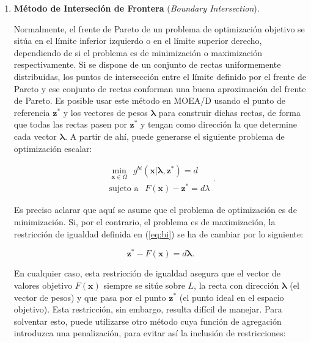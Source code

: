 \begin{enumerate}
	
	\item \textbf{Método de Interseción de Frontera} (\emph{Boundary Intersection}).
	
	
	Normalmente, el frente de Pareto de un problema de optimización objetivo se sitúa en el límite inferior izquierdo o en el límite superior derecho, dependiendo de si el problema es de minimización o maximización respectivamente. Si se dispone de un conjunto de rectas uniformemente distribuidas, los puntos de intersección entre el límite definido por el frente de Pareto y ese conjunto de rectas conforman una buena aproximación del frente de Pareto. Es posible usar este método en MOEA/D usando el punto de referencia $\textbf{z}^*$ y los vectores de pesos $\boldsymbol\lambda$ para construir dichas rectas, de forma que todas las rectas pasen por $\textbf{z}^*$ y tengan como dirección la que determine cada vector $\boldsymbol\lambda$. A partir de ahí, puede generarse el siguiente problema de optimización escalar:
	
	\begin{equation}
	\begin{array}{c}
		\min_{\textbf{x} \in \Omega}{~~g^{bi}(\textbf{x} | \boldsymbol\lambda, \textbf{z}^*) = d} \\
		\text{sujeto a  } ~~F(\textbf{x}) - \textbf{z}^* = d \lambda
		\end{array}.
		\label{eq:bi}
	\end{equation}

	Es preciso aclarar que aquí se asume que el problema de optimización es de minimización. Si, por el contrario, el problema es de maximización, la restricción de igualdad definida en (\ref{eq:bi}) se ha de cambiar por lo siguiente:
	
	
	\begin{equation}
	\textbf{z}^*-F(\textbf{x}) = d \boldsymbol\lambda.
	\end{equation}
	
	  En cualquier caso, esta restricción de igualdad asegura que el vector de valores objetivo $F(\textbf{x})$ siempre se sitúe sobre $L$, la recta con dirección $\boldsymbol\lambda$ (el vector de pesos) y que pasa por el punto $\textbf{z}^*$ (el punto ideal en el espacio objetivo). Esta restricción, sin embargo, resulta difícil de manejar. Para solventar esto, puede utilizarse otro método cuya función de agregación introduzca una penalización, para evitar así la inclusión de restricciones:
	

\end{enumerate}
